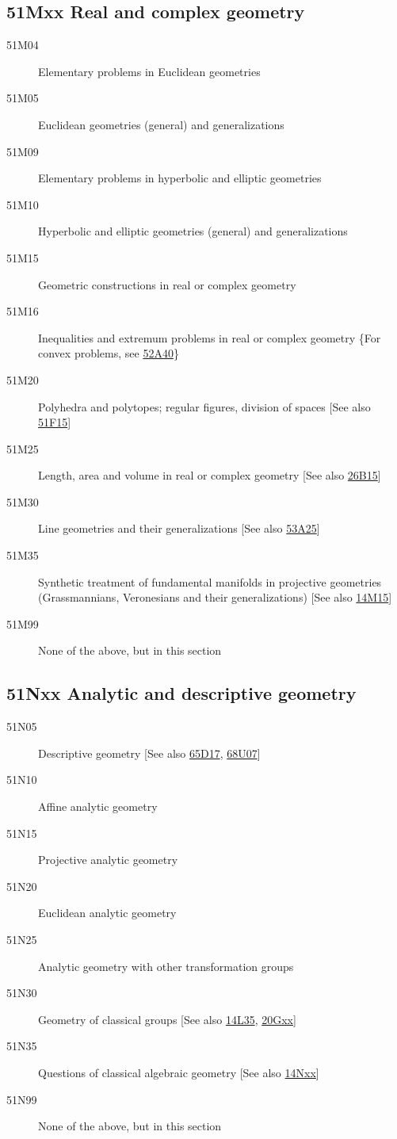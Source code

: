 \documentclass[letterpaper]{article}
\begin{document}
\subsection*{51Mxx  Real and complex geometry }\label{51Mxx}
\begin{description}  
\item [51M04]\label{51M04} Elementary problems in Euclidean geometries
\item [51M05]\label{51M05} Euclidean geometries (general) and generalizations
\item [51M09]\label{51M09} Elementary problems in hyperbolic and elliptic geometries
\item [51M10]\label{51M10} Hyperbolic and elliptic geometries (general) and generalizations
\item [51M15]\label{51M15} Geometric constructions in real or complex geometry
\item [51M16]\label{51M16} Inequalities and extremum problems in real or complex geometry \{For convex problems, see \hyperref[52A40]{52A40}\}
\item [51M20]\label{51M20} Polyhedra and polytopes; regular figures, division of spaces [See also \hyperref[51F15]{51F15}]
\item [51M25]\label{51M25} Length, area and volume in real or complex geometry [See also \hyperref[26B15]{26B15}]
\item [51M30]\label{51M30} Line geometries and their generalizations [See also \hyperref[53A25]{53A25}]
\item [51M35]\label{51M35} Synthetic treatment of fundamental manifolds in projective geometries (Grassmannians, Veronesians and their generalizations) [See also \hyperref[14M15]{14M15}]
\item [51M99]\label{51M99} None of the above, but in this section
\end{description}
\subsection*{51Nxx  Analytic and descriptive geometry }\label{51Nxx}
\begin{description}  
\item [51N05]\label{51N05} Descriptive geometry [See also \hyperref[65D17]{65D17}, \hyperref[68U07]{68U07}]
\item [51N10]\label{51N10} Affine analytic geometry
\item [51N15]\label{51N15} Projective analytic geometry
\item [51N20]\label{51N20} Euclidean analytic geometry
\item [51N25]\label{51N25} Analytic geometry with other transformation groups
\item [51N30]\label{51N30} Geometry of classical groups [See also \hyperref[14L35]{14L35}, \hyperref[20Gxx]{20Gxx}]
\item [51N35]\label{51N35} Questions of classical algebraic geometry [See also \hyperref[14Nxx]{14Nxx}]
\item [51N99]\label{51N99} None of the above, but in this section
\end{description}
\end{document}
